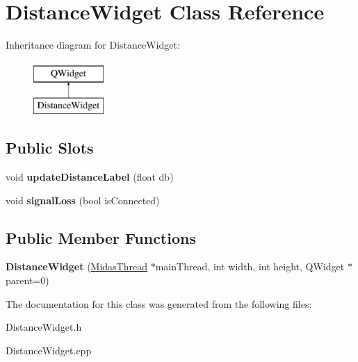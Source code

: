 \hypertarget{class_distance_widget}{\section{Distance\+Widget Class Reference}
\label{class_distance_widget}
}
Inheritance diagram for Distance\+Widget\+:\begin{figure}[H]
\begin{center}
\leavevmode
\includegraphics[height=2.000000cm]{class_distance_widget}
\end{center}
\end{figure}
\subsection*{Public Slots}
\begin{DoxyCompactItemize}
\item 
\hypertarget{class_distance_widget_a43a6338696f4638ef9f57a16cc19a7c9}{void {\bfseries update\+Distance\+Label} (float db)}\label{class_distance_widget_a43a6338696f4638ef9f57a16cc19a7c9}

\item 
\hypertarget{class_distance_widget_af6d4db1f095c7f7356cc8776f1cd4da5}{void {\bfseries signal\+Loss} (bool is\+Connected)}\label{class_distance_widget_af6d4db1f095c7f7356cc8776f1cd4da5}

\end{DoxyCompactItemize}
\subsection*{Public Member Functions}
\begin{DoxyCompactItemize}
\item 
\hypertarget{class_distance_widget_a71ef67c16ce47d82a680c8c93961baaa}{{\bfseries Distance\+Widget} (\hyperlink{class_midas_thread}{Midas\+Thread} $\ast$main\+Thread, int width, int height, Q\+Widget $\ast$parent=0)}\label{class_distance_widget_a71ef67c16ce47d82a680c8c93961baaa}

\end{DoxyCompactItemize}


The documentation for this class was generated from the following files\+:\begin{DoxyCompactItemize}
\item 
Distance\+Widget.\+h\item 
Distance\+Widget.\+cpp\end{DoxyCompactItemize}
